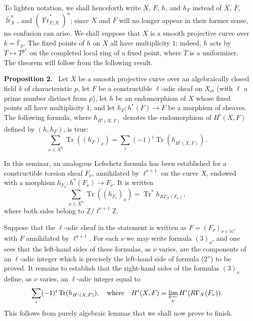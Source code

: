 \documentclass[11pt]{article}
\newenvironment{statement}[1]{\par\medskip\noindent\textbf{#1.}\ }{\par\medskip}
\providecommand{\Tr}{\operatorname{Tr}}
\providecommand{\Tr}{\operatorname{Tr}}
\providecommand{\Tr}{\operatorname{Tr}}
\providecommand{\Tr}{\operatorname{Tr}}
\providecommand{\Tr}{\operatorname{Tr}}
\providecommand{\fr}{\operatorname{fr}}
\providecommand{\Fr}{\operatorname{Fr}}
\providecommand{\Fr}{\operatorname{Fr}}
\providecommand{\fr}{\operatorname{fr}}
\begin{document}
To lighten notation, we shall henceforth write $X$, $F$, $h$, and $h_F$ instead of $\bar X$, $\bar F$, $\bar{\fr}_X^n$, and $(\overline{\Fr}^*_{F/X})^n$; since $X$ and $F$ will no longer appear in their former sense, no confusion can arise. We shall suppose that $X$ is a smooth projective curve over $k=\bar{\mathbb F}_p$. The fixed points of $h$ on $X$ all have multiplicity $1$: indeed, $h$ acts by $T\mapsto T^{p^n}$ on the completed local ring of a fixed point, where $T$ is a uniformizer. The theorem will follow from the following result.

\label{sga5:XV:proposition:2:3}\begin{statement}{Proposition 2}
Let $X$ be a smooth projective curve over an algebraically closed field $k$ of characteristic $p$, let $F$ be a constructible $\ell$-adic sheaf on $X_{\mathrm{et}}$ (with $\ell$ a prime number distinct from $p$), let $h$ be an endomorphism of $X$ whose fixed points all have multiplicity $1$, and let $h_F:h^*(F)\to F$ be a morphism of sheaves. The following formula, where $h_{H^i(X,F)}$ denotes the endomorphism of $H^i(X,F)$ defined by $(h,h_F)$, is true:
\[
\sum_{x\in X^h}\Tr((h_F)_x)=\sum_i(-1)^i\Tr(h_{H^i(X,F)}).
\tag{2''}\label{sga5:XV:equation:2:3}
\]
\end{statement}

In this seminar, an analogous Lefschetz formula has been established for a constructible torsion sheaf $F_\nu$, annihilated by $\ell^{\nu+1}$ on the curve $X$, endowed with a morphism $h_{F_\nu}:h^*(F_\nu)\to F_\nu$. It is written
\[
\sum_{x\in X^h}\Tr((h_{F_\nu})_x)=\Tr^*h_{R\Gamma_X(F_\nu)},
\tag{3}\label{sga5:XV:equation:3}
\]
where both sides belong to $\mathbb Z/\ell^{\nu+1}\mathbb Z$.

Suppose that the $\ell$-adic sheaf in the statement is written as $F=(F_\nu)_{\nu\in\mathbb N}$, with $F$ annihilated by $\ell^{\nu+1}$. For each $\nu$ we may write formula $(3)_\nu$, and one sees that the left-hand sides of these formulas, as $\nu$ varies, are the components of an $\ell$-adic integer which is precisely the left-hand side of formula (2'') to be proved. It remains to establish that the right-hand sides of the formulas $(3)_\nu$ define, as $\nu$ varies, an $\ell$-adic integer equal to
\[
\sum_i(-1)^i\Tr(h_{H^i(X,F)}),
\quad\text{where}\quad
H^i(X,F)=\varprojlim_\nu H^i(R\Gamma_X(F_\nu)).
\]
This follows from purely algebraic lemmas that we shall now prove to finish.
\end{document}
